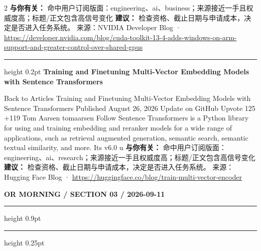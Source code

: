 \documentclass[10.5pt]{ctexart}
\begin{document}
\begin{multicols}{2}
\textbf{与你有关：} 命中用户订阅版面：engineering、ai、business；来源接近一手且权威度高；标题/正文包含高信号变化
\textbf{建议：} 检查资格、截止日期与申请成本，决定是否进入任务系统。
{\footnotesize\color{ormuted} 来源：NVIDIA Developer Blog · \url{https://developer.nvidia.com/blog/cuda-toolkit-13-4-adds-windows-on-arm-support-and-greater-control-over-shared-gpus}}
\vspace{2mm}
\hrule height 0.2pt
\vspace{2mm}
{\large\bfseries Training and Finetuning Multi-Vector Embedding Models with Sentence Transformers}\par
Back to Articles Training and Finetuning Multi-Vector Embedding Models with Sentence Transformers Published August 26, 2026 Update on GitHub Upvote 125 +119 Tom Aarsen tomaarsen Follow Sentence Transformers is a Python library for using and training embedding and reranker models for a wide range of applications, such as retrieval augmented generation, semantic search, semantic textual similarity, and more. Its v6.0 u
\textbf{与你有关：} 命中用户订阅版面：engineering、ai、research；来源接近一手且权威度高；标题/正文包含高信号变化
\textbf{建议：} 检查资格、截止日期与申请成本，决定是否进入任务系统。
{\footnotesize\color{ormuted} 来源：Hugging Face Blog · \url{https://huggingface.co/blog/train-multi-vector-encoder}}
\end{multicols}
\newpage
{\small\bfseries OR MORNING / SECTION 03 / 2026-09-11}
\vspace{2mm}
\hrule height 0.9pt
\vspace{1.5mm}
\hrule height 0.25pt
\vspace{4mm}
\end{document}
